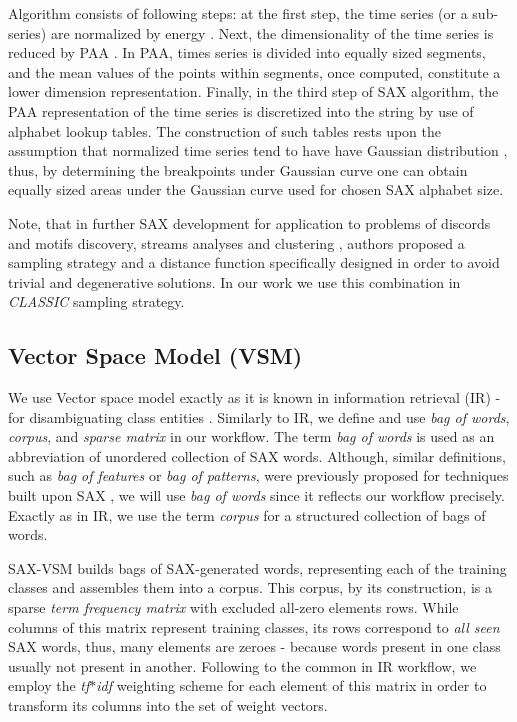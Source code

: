 \documentclass{llncs}
\begin{document}
Algorithm consists of following steps: at the first step, the time series (or a sub-series) are
normalized by energy \cite{goldin_kanellakis}. 
Next, the dimensionality of the time series is reduced by PAA \cite{paa}. 
In PAA, times series is divided into equally sized segments, and the mean values 
of the points within segments, once computed, constitute a lower dimension representation. 
Finally, in the third step of SAX algorithm, the PAA representation 
of the time series is discretized into the string by use of alphabet lookup tables. The construction
of such tables rests upon the assumption that normalized time series tend to have have Gaussian 
distribution \cite{larsen_marx}, thus, by determining the breakpoints under Gaussian curve one 
can obtain equally sized areas under the Gaussian curve used for chosen SAX alphabet size.

Note, that in further SAX development \cite{hot_sax} for application to problems of discords
and motifs discovery, streams analyses and clustering \cite{streaming_sax}, authors proposed a 
sampling strategy and a distance function specifically designed in order to avoid trivial and 
degenerative solutions. In our work we use this combination in \textit{CLASSIC} sampling strategy.

\subsection{Vector Space Model (VSM)}
We use Vector space model exactly as it is known in information retrieval (IR) - 
for disambiguating class entities \cite{salton}. 
Similarly to IR, we define and use \textit{bag of words}, \textit{corpus}, and
\textit{sparse matrix} in our workflow. 
The term \textit{bag of words} is used as an abbreviation of unordered collection of SAX words. 
Although, similar definitions, such as \textit{bag of features} or \textit{bag of patterns}, 
were previously proposed for techniques built upon SAX \cite{bag_patterns}, we will 
use \textit{bag of words} since it reflects our workflow precisely. Exactly as in IR, we use the 
term \textit{corpus} for a structured collection of bags of words. 

SAX-VSM builds bags of SAX-generated words, representing each of the training classes and 
assembles them into a corpus. This corpus, by its construction, is a sparse \textit{term frequency 
matrix} with excluded all-zero elements rows. While columns of this matrix represent training 
classes, its rows correspond to \textit{all seen} SAX words, thus, many elements are zeroes - 
because words present in one class usually not present in another. 
Following to the common in IR workflow, we employ the \textit{tf$\ast$idf} weighting scheme 
for each element of this matrix in order to transform its columns into the set of weight vectors. 
\end{document}
